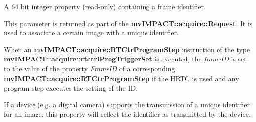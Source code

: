 A 64 bit integer property {\bfseries }(read-\/only) containing a frame identifier. 

This parameter is returned as part of the {\bfseries \hyperlink{classmv_i_m_p_a_c_t_1_1acquire_1_1_request}{mv\+I\+M\+P\+A\+C\+T\+::acquire\+::\+Request}}. It is used to associate a certain image with a unique identifier.

When an {\bfseries \hyperlink{classmv_i_m_p_a_c_t_1_1acquire_1_1_r_t_ctr_program_step}{mv\+I\+M\+P\+A\+C\+T\+::acquire\+::\+R\+T\+Ctr\+Program\+Step}} instruction of the type {\bfseries mv\+I\+M\+P\+A\+C\+T\+::acquire\+::rtctrl\+Prog\+Trigger\+Set} is executed, the {\itshape frame\+I\+D} is set to the value of the property {\itshape Frame\+I\+D} of a corresponding {\bfseries \hyperlink{classmv_i_m_p_a_c_t_1_1acquire_1_1_r_t_ctr_program_step}{mv\+I\+M\+P\+A\+C\+T\+::acquire\+::\+R\+T\+Ctr\+Program\+Step}} if the H\+R\+T\+C is used and any program step executes the setting of the I\+D.

If a device (e.\+g. a digital camera) supports the transmission of a unique identifier for an image, this property will reflect the identifier as transmitted by the device.

